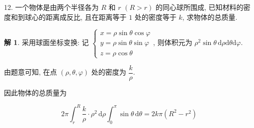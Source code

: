 \documentclass[a4paper,12pt]{article}
\theoremstyle{definition}
\newtheorem*{sol}{解}
\begin{document}
12. 一个物体是由两个半径各为 $R$ 和 $r$ $(R>r)$ 的同心球所围成, 已知材料的密度和到球心的距离成反比, 且在距离等于 $1$ 处的密度等于 $k$, 求物体的总质量.
\begin{sol}
    采用球面坐标变换: 记 $\begin{cases}
            x=\rho\sin\theta\cos\varphi \\
            y=\rho\sin\theta\sin\varphi \\
            z=\rho\cos\theta
        \end{cases}$, 则体积元为 $\rho^2\sin\theta\,\mathrm{d}\rho\mathrm{d}\theta\mathrm{d}\varphi$.

    由题意可知, 在点 $(\rho,\theta,\varphi)$ 处的密度为 $\dfrac{k}{\rho}$.

    因此物体的总质量为

    $$2\pi\int_r^R\frac{k}{\rho} \cdot \rho^2 \, \mathrm{d}\rho\int_0^{\pi}\sin\theta\,\mathrm{d}\theta=2k\pi(R^2-r^2)$$
\end{sol}
\end{document}
